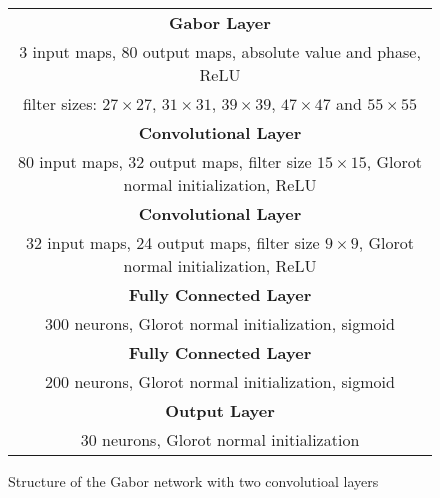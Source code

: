 \begin{figure}[h!]
	\scriptsize
	\centering
	\begin{tabular}{|c|}
	\hline
		\textbf{Gabor Layer}\\
		3 input maps, 80 output maps, absolute value and phase, ReLU\\
		filter sizes: $27 \times 27$, $31 \times 31$, $39 \times 39$, $47 \times 47$ and $55 \times 55$\\
	\hline
		\textbf{Convolutional Layer}\\
		80 input maps, 32 output maps, filter size $15\times15$, Glorot normal initialization, \ac{ReLU}\\
	\hline
		\textbf{Convolutional Layer}\\
		32 input maps, 24 output maps, filter size $9\times9$, Glorot normal initialization, \ac{ReLU}\\
	\hline
		\textbf{Fully Connected Layer}\\
		300 neurons, Glorot normal initialization, sigmoid\\
	\hline
		\textbf{Fully Connected Layer}\\
		200 neurons, Glorot normal initialization, sigmoid\\
	\hline
		\textbf{Output Layer}\\
		30 neurons, Glorot normal initialization\\
	\hline
	\end{tabular}
	\caption{Structure of the Gabor network with two convolutioal layers}
	\label{fig:gabor_structure_2cl}
\end{figure}
